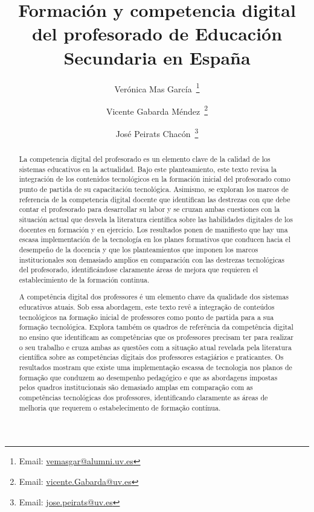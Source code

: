 \documentclass[spanish]{textolivre}
\title{Formación y competencia digital del profesorado de Educación Secundaria en España}
\author[1,2]{Verónica Mas García~\orcid{0000-0002-8615-9949}\thanks{Email: \href{mailto:vemasgar@alumni.uv.es}{vemasgar@alumni.uv.es}}}
\author[2]{Vicente Gabarda Méndez~\orcid{0000-0001-6159-5173}\thanks{Email: \href{mailto:vicente.Gabarda@uv.es}{vicente.Gabarda@uv.es}}}
\author[2]{José Peirats Chacón~\orcid{0000-0002-6580-2712}\thanks{Email: \href{mailto:jose.peirats@uv.es}{jose.peirats@uv.es}}}
\affil[1]{Universidad Internacional de Valencia (VIU), Facultad de Educación, Valencia, España.}
\affil[2]{Universitat de Valencia (UV), Facultad de Filosofía y Ciencias de la Educación, Valencia, España.}
\begin{document}
\maketitle

\begin{polyabstract}
\begin{abstract}
La competencia digital del profesorado es un elemento clave de la calidad de los sistemas educativos en la actualidad. Bajo este planteamiento, este texto revisa la integración de los contenidos tecnológicos en la formación inicial del profesorado como punto de partida de su capacitación tecnológica. Asimismo, se exploran los marcos de referencia de la competencia digital docente que identifican las destrezas con que debe contar el profesorado para desarrollar su labor y se cruzan ambas cuestiones con la situación actual que desvela la literatura científica sobre las habilidades digitales de los docentes en formación y en ejercicio. Los resultados ponen de manifiesto que hay una escasa implementación de la tecnología en los planes formativos que conducen hacia el desempeño de la docencia y que los planteamientos que imponen los marcos institucionales son demasiado amplios en comparación con las destrezas tecnológicas del profesorado, identificándose claramente áreas de mejora que requieren el establecimiento de la formación continua.

\end{abstract}

\begin{portuguese}
\begin{abstract}
A competência digital dos professores é um elemento chave da qualidade dos sistemas educativos atuais. Sob essa abordagem, este texto revê a integração de conteúdos tecnológicos na formação inicial de professores como ponto de partida para a sua formação tecnológica. Explora também os quadros de referência da competência digital no ensino que identificam as competências que os professores precisam ter para realizar o seu trabalho e cruza ambas as questões com a situação atual revelada pela literatura científica sobre as competências digitais dos professores estagiários e praticantes. Os resultados mostram que existe uma implementação escassa de tecnologia nos planos de formação que conduzem ao desempenho pedagógico e que as abordagens impostas pelos quadros institucionais são demasiado amplas em comparação com as competências tecnológicas dos professores, identificando claramente as áreas de melhoria que requerem o estabelecimento de formação contínua.


\end{abstract}
\end{portuguese}
\end{polyabstract}
\end{document}
